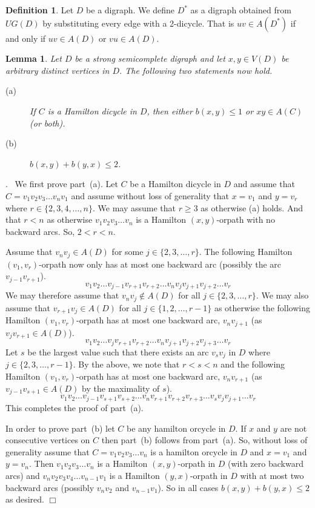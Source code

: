 \documentclass{article}
\newcommand{\2}{\vspace{2mm}}
\renewenvironment{proof}[1][]{\par \noindent {\bf Proof#1}.\ }{\hfill$\Box$
\par \vspace{11pt}}
\newtheorem{lemma}[theorem]{Lemma}
\theoremstyle{definition}
\newtheorem{definition}[theorem]{Definition}
\begin{document}
\begin{definition}
Let $D$ be a digraph. We define $D^*$ as a digraph obtained from $UG(D)$ by substituting every edge with a 2-dicycle. That is $uv \in A(D^*)$ if and only if $uv \in A(D)$ or $vu \in A(D)$.   
\end{definition}

\begin{lemma} \label{PathStrongSemiC}
Let $D$ be a strong semicomplete digraph and let $x,y \in V(D)$ be arbitrary distinct vertices in $D$. The following two statements now hold.

\begin{description}
\item[(a)] If $C$ is a Hamilton dicycle in $D$, then either $b(x,y) \le 1$ or $xy \in A(C)$ (or both).
\item[(b)] $b(x,y) + b(y,x) \le 2$.
\end{description}
\end{lemma}

\begin{proof}
We first prove part~(a). Let $C$ be a Hamilton dicycle in $D$ and assume that $C=v_1v_2v_3 \ldots v_nv_1$ and 
assume without loss of generality that $x = v_1$ and $y=v_r$ where $r \in \{2,3,4, \ldots , n\}$.
We may assume that $r \geq 3$ as otherwise (a) holds.  And that $r<n$ as otherwise $v_1v_2v_3 \ldots v_n$ is a Hamilton $(x,y)$-orpath with no backward arcs. So, $ 2 < r < n$.

Assume that  $v_n v_j \in A(D) $ for some $j \in \{2,3,\ldots, r\}$. 
The following  Hamilton $(v_1,v_r)$-orpath now only has at most one backward arc (possibly the arc $v_{j-1} v_{r+1}$).
\[
v_1 v_2 \ldots v_{j-1} v_{r+1} v_{r+2} \ldots v_n v_j v_{j+1} v_{j+2} \ldots v_r
\]
We may therefore assume that $v_n v_j \not\in A(D)$ for all $j \in \{2,3,\ldots, r \}$.
We may also assume that $v_{r+1} v_j \in A(D)$ for all $j \in \{1,2,\ldots, r-1 \}$ 
as otherwise the following Hamilton $(v_1,v_r)$-orpath has
at most one backward arc, $v_n v_{j+1}$ (as $v_j v_{r+1} \in A(D)$).
\[
v_1 v_2 \ldots v_j v_{r+1} v_{r+2} \ldots v_n v_{j+1} v_{j+2} v_{j+3} \ldots v_r
\]
Let $s$ be the largest value such that there exists an arc $v_s v_j$ in $D$ where $j \in \{2,3,\ldots,r-1\}$.
By the above, we note that $r< s <n$ and  the following Hamilton $(v_1,v_r)$-orpath has
at most one backward arc, $v_n v_{r+1}$ (as $v_{j-1} v_{s+1} \in A(D)$ by the maximality of $s$).
\[
v_1 v_2 \ldots v_{j-1} v_{s+1} v_{s+2} \ldots v_n v_{r+1} v_{r+2} v_{r+3} \ldots v_s v_j v_{j+1} \ldots v_r
\]
This completes the proof of part~(a).

In order to prove part~(b) let $C$ be any hamilton orcycle in $D$. If $x$ and $y$ are not consecutive vertices on $C$ then part~(b) follows from part~(a). So, without loss of generality assume that $C=v_1v_2v_3 \ldots v_n$ is a hamilton orcycle in $D$ 
and $x=v_1$ and $y=v_n$. Then $v_1v_2v_3 \ldots v_n$ is a Hamilton $(x,y)$-orpath in $D$ (with zero backward arcs) and
$v_nv_2v_3v_4 \ldots v_{n-1} v_1$ is a Hamilton $(y,x)$-orpath in $D$ with at most two backward arcs (possibly
$v_nv_2$ and $v_{n-1} v_1$). So in all cases $b(x,y) + b(y,x) \le 2$ as desired.
\end{proof}
\end{document}

